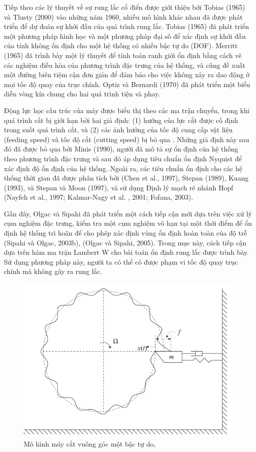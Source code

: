 Tiếp theo các lý thuyết  về sự rung lắc cổ điển được giới thiệu bởi Tobias (1965) và Tlusty (2000) vào những năm 1960, nhiều mô hình khác nhau đã được phát triển để dự đoán sự khởi đầu của quá trình rung lắc. Tobias (1965) đã phát triển một phương pháp hình học và một phương pháp đại số để xác định sự khởi đầu của tính không ổn định cho một hệ thống có nhiều bậc tự do (DOF). Merritt (1965) đã trình bày một lý thuyết để tính toán ranh giới ổn định bằng cách vẽ các nghiệm điều hòa của phương trình đặc trưng của hệ thống, và cũng đề xuất một đường biên tiệm cận đơn giản để đảm bảo cho việc  không xảy ra dao động ở mọi tốc độ quay của trục chính. Optiz và Bernardi (1970) đã phát triển một biểu diễn vòng kín chung cho hai quá trình tiện và phay. 

Động lực học cấu trúc của máy được biểu thị theo các ma trận chuyển, trong khi quá trình cắt bị giới hạn bởi hai giả định: (1) hướng của lực cắt được cố định trong suốt quá trình cắt, và (2) các ảnh hưởng của tốc độ cung cấp vật liệu (feeding speed) và tốc độ cắt (cutting speed) bị bỏ qua . Những giả định này sau đó đã được bỏ qua bởi Minis (1990), người đã mô tả sự ổn định của hệ thống theo phương trình đặc trưng và sau đó áp dụng tiêu chuẩn ổn định Nyquist để xác định độ ổn định của hệ thống.  Ngoài ra, các tiêu chuẩn ổn định cho các hệ thống thời gian đã được phân tích bởi (Chen et al., 1997), Stepan (1989), Kuang (1993), và Stepan và Moon (1997), và sử dụng Định lý mạch rẽ nhánh Hopf (Nayfeh et al., 1997; Kalmar-Nagy et al. , 2001; Fofana, 2003). 

Gần đây, Olgac và Sipahi đã phát triển một cách tiếp cận mới dựa trên việc xử lý cụm nghiệm đặc trưng, kiểm tra một cụm nghiệm vô hạn tại một thời điểm để ổn định hệ thống trì hoãn để cho phép xác định vùng ổn định hoàn toàn của độ trễ (Sipahi và Olgac, 2003b), (Olgac và Sipahi, 2005). 
Trong mục này, cách tiếp cận dựa trên hàm ma trận Lambert W cho bài toán ổn định rung lắc được trình bày.  Sử dụng phương pháp này, người ta có thể có được phạm vi tốc độ quay trục chính mà không gây ra rung lắc. 

\begin{figure}[h!]
	\centering
	\includegraphics[width=0.7\linewidth]{hinh/machine_tool_chatter}
	\caption{Mô hình máy cắt vuông góc một bậc tự do, \cite[Chương 3]{Yi10}}
	\label{fig:machinetoolchatter}
\end{figure}

